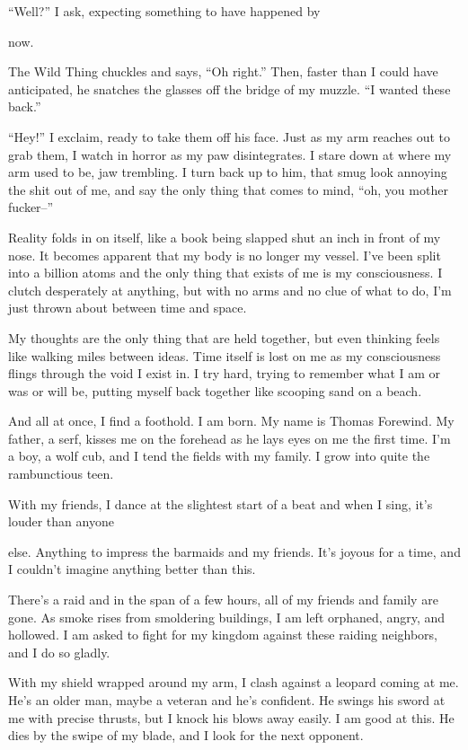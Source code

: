 ``Well?'' I ask, expecting something to have happened by

now.

The Wild Thing chuckles and says, ``Oh right.'' Then, faster than I could
have anticipated, he snatches the glasses off the bridge of my muzzle.
``I wanted these back.''

``Hey!'' I exclaim, ready to take them off his face. Just as my arm
reaches out to grab them, I watch in horror as my paw disintegrates. I
stare down at where my arm used to be, jaw trembling. I turn back up to
him, that smug look annoying the shit out of me, and say the only thing
that comes to mind, ``oh, you mother fucker--''

Reality folds in on itself, like a book being slapped shut an inch in
front of my nose. It becomes apparent that my body is no longer my
vessel. I've been split into a billion atoms and the only thing that
exists of me is my consciousness. I clutch desperately at anything, but
with no arms and no clue of what to do, I'm just thrown about between
time and space.

My thoughts are the only thing that are held together, but even thinking
feels like walking miles between ideas. Time itself is lost on me as my
consciousness flings through the void I exist in. I try hard, trying to
remember what I am or was or will be, putting myself back together like
scooping sand on a beach.

And all at once, I find a foothold. I am born. My name is Thomas
Forewind. My father, a serf, kisses me on the forehead as he lays eyes
on me the first time. I'm a boy, a wolf cub, and I tend the fields with
my family. I grow into quite the rambunctious teen.

With my friends, I dance at the slightest start of a beat and when I
sing, it's louder than anyone

else. Anything to impress the barmaids and my friends. It's joyous for a
time, and I couldn't imagine anything better than this.

There's a raid and in the span of a few hours, all of my friends and
family are gone. As smoke rises from smoldering buildings, I am left
orphaned, angry, and hollowed. I am asked to fight for my kingdom
against these raiding neighbors, and I do so gladly.

With my shield wrapped around my arm, I clash against a leopard coming
at me. He's an older man, maybe a veteran and he's confident. He swings
his sword at me with precise thrusts, but I knock his blows away easily.
I am good at this. He dies by the swipe of my blade, and I look for the
next opponent.

